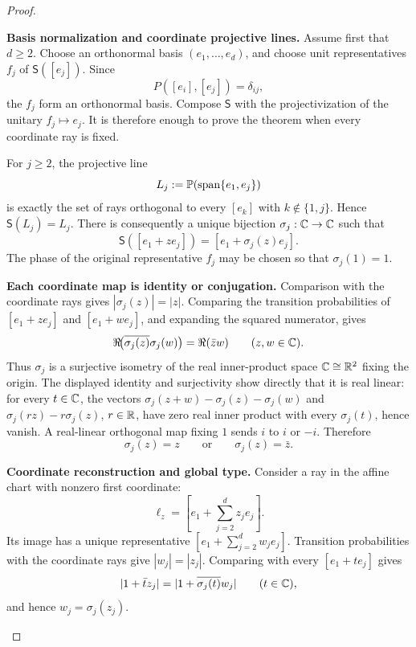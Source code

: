 \documentclass[12pt,a4paper]{article}
\begin{document}
\begin{proof}
\begin{proofsteps}

\item \textbf{Basis normalization and coordinate projective lines.}
Assume first that \(d\ge2\).  Choose an orthonormal basis
\((e_1,\dots,e_d)\), and choose unit representatives \(f_j\) of
\(\mathsf S([e_j])\).  Since
\[
P([e_i],[e_j])=\delta_{ij},
\]
the \(f_j\) form an orthonormal basis.  Compose \(\mathsf S\) with the
projectivization of the unitary \(f_j\mapsto e_j\).  It is therefore enough
to prove the theorem when every coordinate ray is fixed.

For \(j\ge2\), the projective line
\[
L_j:=\mathbb{P}(\operatorname{span}\{e_1,e_j\})
\]
is exactly the set of rays orthogonal to every \([e_k]\) with
\(k\notin\{1,j\}\).  Hence \(\mathsf S(L_j)=L_j\).  There is consequently a
unique bijection \(\sigma_j:\mathbb{C}\to\mathbb{C}\) such that
\[
\mathsf S([e_1+ze_j])=[e_1+\sigma_j(z)e_j].
\]
The phase of the original representative \(f_j\) may be chosen so that
\(\sigma_j(1)=1\).

\item \textbf{Each coordinate map is identity or conjugation.}
Comparison with the coordinate rays gives
\(|\sigma_j(z)|=|z|\).  Comparing the transition probabilities of
\([e_1+ze_j]\) and \([e_1+we_j]\), and expanding the squared numerator, gives
\[
\Re\!\bigl(\overline{\sigma_j(z)}\sigma_j(w)\bigr)
=\Re(\bar zw)
\qquad(z,w\in\mathbb{C}).
\]
Thus \(\sigma_j\) is a surjective isometry of the real inner-product space
\(\mathbb{C}\cong\mathbb{R}^2\) fixing the origin.  The displayed identity and surjectivity
show directly that it is real linear: for every \(t\in\mathbb{C}\), the vectors
\(\sigma_j(z+w)-\sigma_j(z)-\sigma_j(w)\) and
\(\sigma_j(rz)-r\sigma_j(z)\), \(r\in\mathbb{R}\), have zero real inner product with
every \(\sigma_j(t)\), hence vanish.  A real-linear orthogonal map fixing
\(1\) sends \(i\) to \(i\) or \(-i\).  Therefore
\[
\sigma_j(z)=z
\qquad\text{or}\qquad
\sigma_j(z)=\bar z.
\]

\item \textbf{Coordinate reconstruction and global type.}
Consider a ray in the affine chart with nonzero first coordinate:
\[
\ell_z=[e_1+\textstyle\sum_{j=2}^d z_je_j].
\]
Its image has a unique representative
\([e_1+\sum_{j=2}^d w_je_j]\).  Transition probabilities with the coordinate
rays give \(|w_j|=|z_j|\).  Comparing with every
\([e_1+te_j]\) gives
\[
|1+\bar t z_j|
=
|1+\overline{\sigma_j(t)}w_j|
\qquad(t\in\mathbb{C}),
\]
and hence \(w_j=\sigma_j(z_j)\).


\end{proofsteps}
\end{proof}
\end{document}
